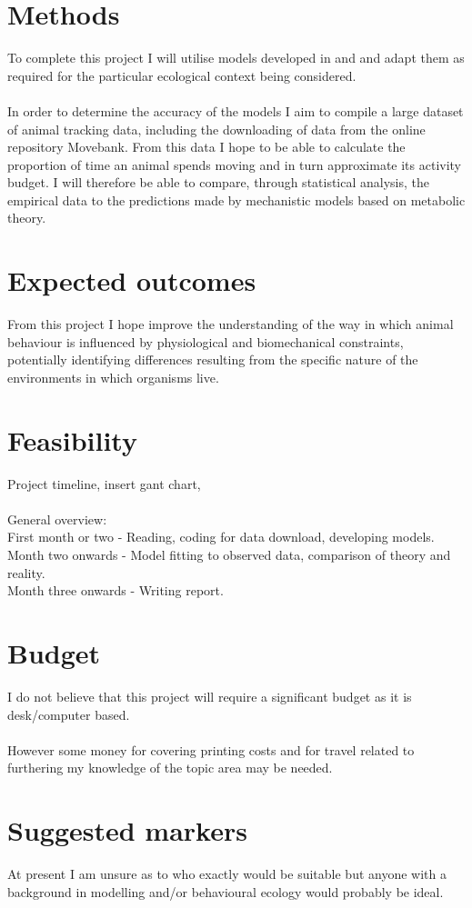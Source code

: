 \documentclass[11pt]{article}
\begin{document}
\section*{Methods}
To complete this project I will utilise models developed in \citet{pawar2012dimensionality} and \citet{rizzutoinpress} and adapt them as required for the particular ecological context being considered.
\\
\\
In order to determine the accuracy of the models I aim to compile a large dataset of animal tracking data, including the downloading of data from the online repository Movebank. From this data I hope to be able to calculate the proportion of time an animal spends moving and in turn approximate its activity budget. I will therefore be able to compare, through statistical analysis, the empirical data to the predictions made by mechanistic models based on metabolic theory. 


\section*{Expected outcomes}
From this project I hope improve the understanding of the way in which animal behaviour is influenced by physiological and biomechanical constraints, potentially identifying differences resulting from the specific nature of the environments in which organisms live. 

\section*{Feasibility}
Project timeline, insert gant chart, 
\\
\\
General overview:
\\
First month or two - Reading, coding for data download, developing models.
\\
Month two onwards - Model fitting to observed data, comparison of theory and reality.
\\
Month three onwards - Writing report.

\section*{Budget}
I do not believe that this project will require a significant budget as it is desk/computer based.
\\
\\
However some money for covering printing costs and for travel related to furthering my knowledge of the topic area may be needed. 

\section*{Suggested markers}
At present I am unsure as to who exactly would be suitable but anyone with a background in modelling and/or behavioural ecology would probably be ideal. 

\newpage


\end{document}
